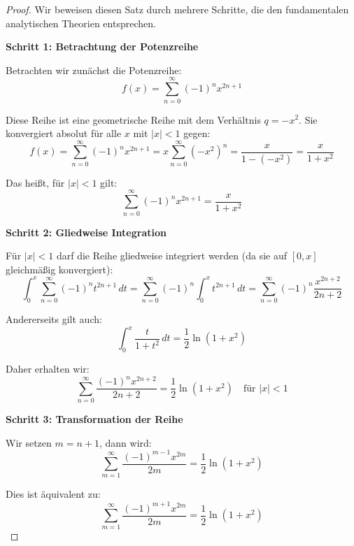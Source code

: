 \documentclass[a4paper, 12pt, twoside, openright]{report}
\theoremstyle{definition}
\theoremstyle{definition}
\begin{document}
\begin{proof}
Wir beweisen diesen Satz durch mehrere Schritte, die den fundamentalen analytischen Theorien entsprechen.

\textbf{Schritt 1: Betrachtung der Potenzreihe}

Betrachten wir zunächst die Potenzreihe:
\begin{equation}
f(x) = \sum_{n=0}^{\infty} (-1)^n x^{2n+1}
\end{equation}

Diese Reihe ist eine geometrische Reihe mit dem Verhältnis $q = -x^2$. Sie konvergiert absolut für alle $x$ mit $|x| < 1$ gegen:
\begin{equation}
f(x) = \sum_{n=0}^{\infty} (-1)^n x^{2n+1} = x \sum_{n=0}^{\infty} (-x^2)^n = \frac{x}{1 - (-x^2)} = \frac{x}{1+x^2}
\end{equation}

Das heißt, für $|x| < 1$ gilt:
\begin{equation}
\sum_{n=0}^{\infty} (-1)^n x^{2n+1} = \frac{x}{1+x^2}
\end{equation}

\textbf{Schritt 2: Gliedweise Integration}

Für $|x| < 1$ darf die Reihe gliedweise integriert werden (da sie auf $[0,x]$ gleichmäßig konvergiert):
\begin{equation}
\int_0^x \sum_{n=0}^{\infty} (-1)^n t^{2n+1} \, dt = \sum_{n=0}^{\infty} (-1)^n \int_0^x t^{2n+1} \, dt = \sum_{n=0}^{\infty} (-1)^n \frac{x^{2n+2}}{2n+2}
\end{equation}

Andererseits gilt auch:
\begin{equation}
\int_0^x \frac{t}{1+t^2} \, dt = \frac{1}{2} \ln(1+x^2)
\end{equation}

Daher erhalten wir:
\begin{equation}
\sum_{n=0}^{\infty} \frac{(-1)^n x^{2n+2}}{2n+2} = \frac{1}{2} \ln(1+x^2) \quad \text{für } |x| < 1
\end{equation}

\textbf{Schritt 3: Transformation der Reihe}

Wir setzen $m = n+1$, dann wird:
\begin{equation}
\sum_{m=1}^{\infty} \frac{(-1)^{m-1} x^{2m}}{2m} = \frac{1}{2} \ln(1+x^2)
\end{equation}

Dies ist äquivalent zu:
\begin{equation}
\sum_{m=1}^{\infty} \frac{(-1)^{m+1} x^{2m}}{2m} = \frac{1}{2} \ln(1+x^2)
\end{equation}


\end{proof}
\end{document}
